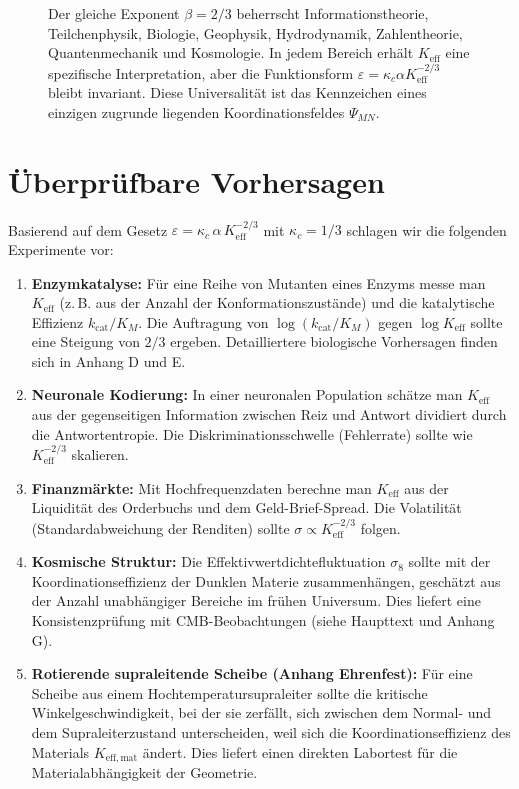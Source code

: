 \documentclass[12pt]{article}
\newcommand{\Keff}{K_{\mathrm{eff}}}
\newcommand{\eps}{\varepsilon}
\newcommand{\kappac}{\kappa_c}
\begin{document}
\begin{figure}[H]
		\caption{Der gleiche Exponent \(\beta = 2/3\) beherrscht Informationstheorie, Teilchenphysik, Biologie, Geophysik, Hydrodynamik, Zahlentheorie, Quantenmechanik und Kosmologie. In jedem Bereich erhält \(K_{\mathrm{eff}}\) eine spezifische Interpretation, aber die Funktionsform \(\varepsilon = \kappa_c \alpha K_{\mathrm{eff}}^{-2/3}\) bleibt invariant. Diese Universalität ist das Kennzeichen eines einzigen zugrunde liegenden Koordinationsfeldes \(\Psi_{MN}\).}
		\label{fig:unified-beta}
	\end{figure}
	
	\section{Überprüfbare Vorhersagen}
	\label{sec:predictions}
	
	Basierend auf dem Gesetz \(\eps = \kappac\,\alpha\,\Keff^{-2/3}\) mit \(\kappac = 1/3\) schlagen wir die folgenden Experimente vor:
	
	\begin{enumerate}
		\item \textbf{Enzymkatalyse:} Für eine Reihe von Mutanten eines Enzyms messe man \(\Keff\) (z. B. aus der Anzahl der Konformationszustände) und die katalytische Effizienz \(k_{\text{cat}}/K_M\). Die Auftragung von \(\log(k_{\text{cat}}/K_M)\) gegen \(\log \Keff\) sollte eine Steigung von \(2/3\) ergeben. Detailliertere biologische Vorhersagen finden sich in Anhang D und E.
		\item \textbf{Neuronale Kodierung:} In einer neuronalen Population schätze man \(\Keff\) aus der gegenseitigen Information zwischen Reiz und Antwort dividiert durch die Antwortentropie. Die Diskriminationsschwelle (Fehlerrate) sollte wie \(\Keff^{-2/3}\) skalieren.
		\item \textbf{Finanzmärkte:} Mit Hochfrequenzdaten berechne man \(\Keff\) aus der Liquidität des Orderbuchs und dem Geld-Brief-Spread. Die Volatilität (Standardabweichung der Renditen) sollte \(\sigma \propto \Keff^{-2/3}\) folgen.
		\item \textbf{Kosmische Struktur:} Die Effektivwertdichtefluktuation \(\sigma_8\) sollte mit der Koordinationseffizienz der Dunklen Materie zusammenhängen, geschätzt aus der Anzahl unabhängiger Bereiche im frühen Universum. Dies liefert eine Konsistenzprüfung mit CMB-Beobachtungen (siehe Haupttext und Anhang G).
		\item \textbf{Rotierende supraleitende Scheibe (Anhang Ehrenfest):} Für eine Scheibe aus einem Hochtemperatursupraleiter sollte die kritische Winkelgeschwindigkeit, bei der sie zerfällt, sich zwischen dem Normal- und dem Supraleiterzustand unterscheiden, weil sich die Koordinationseffizienz des Materials \(K_{\mathrm{eff,mat}}\) ändert. Dies liefert einen direkten Labortest für die Materialabhängigkeit der Geometrie.
	\end{enumerate}
	
\end{document}
